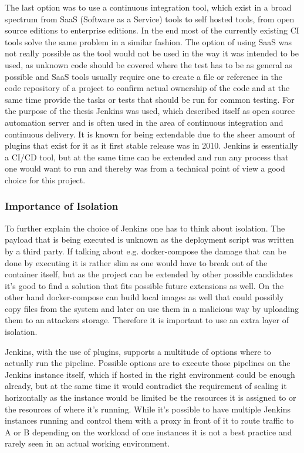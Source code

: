 The last option was to use a continuous integration tool, which exist in a broad spectrum from SaaS (Software as a Service) tools to self hosted tools, from open source editions to enterprise editions. In the end most of the currently existing CI tools solve the same problem in a similar fashion. The option of using SaaS was not really possible as the tool would not be used in the way it was intended to be used, as unknown code should be covered where the test has to be as general as possible and SaaS tools usually require one to create a file or reference in the code repository of a project to confirm actual ownership of the code and at the same time provide the tasks or tests that should be run for common testing.
For the purpose of the thesis Jenkins was used, which described itself as open source automation server and is often used in the area of continuous integration and continuous delivery. It is known for being extendable due to the sheer amount of plugins that exist for it as it first stable release was in 2010. Jenkins is essentially a CI/CD tool, but at the same time can be extended and run any process that one would want to run and thereby was from a technical point of view a good choice for this project.

\subsubsection{Importance of Isolation}
To further explain the choice of Jenkins one has to think about isolation. The payload that is being executed is unknown as the deployment script was written by a third party. If talking about e.g. docker-compose the damage that can be done by executing it is rather slim as one would have to break out of the container itself, but as the project can be extended by other possible candidates it's good to find a solution that fits possible future extensions as well. On the other hand docker-compose can build local images as well that could possibly copy files from the system and later on use them in a malicious way by uploading them to an attackers storage. Therefore it is important to use an extra layer of isolation.

Jenkins, with the use of plugins, supports a multitude of options where to actually run the pipeline.
Possible options are to execute those pipelines on the Jenkins instance itself, which if hosted in the right environment could be enough already, but at the same time it would contradict the requirement of scaling it horizontally as the instance would be limited be the resources it is assigned to or the resources of where it's running. While it's possible to have multiple Jenkins instances running and control them with a proxy in front of it to route traffic to A or B depending on the workload of one instances it is not a best practice and rarely seen in an actual working environment.


